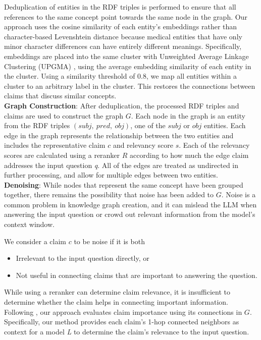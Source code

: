 \documentclass[11pt]{article}
\theoremstyle{definition}
\begin{document}
Deduplication of entities in the RDF triples is performed to ensure that all references to the same concept point towards the same node in the graph. Our approach uses the cosine similarity of each entity's embeddings rather than character-based Levenshtein distance because medical entities that have only minor character differences can have entirely different meanings. Specifically, embeddings are placed into the same cluster with Unweighted Average Linkage Clustering (UPGMA) \cite{sokal1958statistical}, using the average embedding similarity of each entity in the cluster. Using a similarity threshold of 0.8, we map all entities within a cluster to an arbitrary label in the cluster. This restores the connections between claims that discuss similar concepts.  
\\

\noindent
\textbf{Graph Construction}\label{sec:graphConstruct}: After deduplication, the processed RDF triples and claims are used to construct the graph $G$. Each node in the graph is an entity from the RDF triples $(subj, \ pred, \ obj)$, one of the $subj$ or $obj$ entities. Each edge in the graph represents the relationship between the two entities and includes the representative claim $c$ and relevancy score $s$. Each of the relevancy scores are calculated using a reranker $R$ according to how much the edge claim addresses the input question \textit{q}. All of the edges are treated as undirected in further processing, and allow for multiple edges between two entities. 
\\

\noindent
\textbf{Denoising}\label{sec:denoise}: While nodes that represent the same concept have been grouped together, there remains the possibility that noise has been added to $G$. Noise is a common problem in knowledge graph creation, and it can mislead the LLM when answering the input question or crowd out relevant information from the model's context window.

We consider a claim $c$ to be noise if it is both
\begin{itemize}[noitemsep,leftmargin=*]
    \item Irrelevant to the input question directly, or
    \item Not useful in connecting claims that are important to answering the question.
\end{itemize}
While using a reranker can determine claim relevance, it is insufficient to determine whether the claim helps in connecting important information. Following \cite{DBLP:journals/corr/abs-2409-00861}, our approach evaluates claim importance using its connections in $G$. Specifically, our method provides each claim's 1-hop connected neighbors as context for a model \textit{L} to determine the claim's relevance to the input question. 
\end{document}
